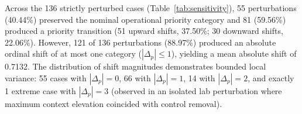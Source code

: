 \documentclass[conference]{IEEEtran}
\begin{document}
\begin{table}[t]
\centering
\caption{Deterministic Contextual Priority Sensitivity Stress Test Results Across 136 Valid Local Perturbations}
\label{tab:sensitivity}
\end{table}

Across the 136 strictly perturbed cases (Table~\ref{tab:sensitivity}), 55 perturbations (40.44\%) preserved the nominal operational priority category and 81 (59.56\%) produced a priority transition (51 upward shifts, 37.50\%; 30 downward shifts, 22.06\%). However, 121 of 136 perturbations (88.97\%) produced an absolute ordinal shift of at most one category ($|\Delta_p| \le 1$), yielding a mean absolute shift of 0.7132. The distribution of shift magnitudes demonstrates bounded local variance: 55 cases with $|\Delta_p| = 0$, 66 with $|\Delta_p| = 1$, 14 with $|\Delta_p| = 2$, and exactly 1 extreme case with $|\Delta_p| = 3$ (observed in an isolated lab perturbation where maximum context elevation coincided with control removal).
\end{document}

